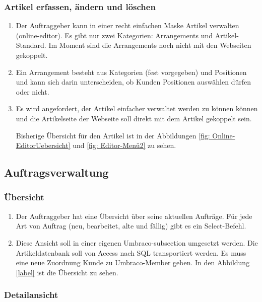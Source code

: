 \subsubsection{Artikel erfassen, ändern und löschen}

\begin{enumerate}
	\item Der Auftraggeber kann in einer recht einfachen Maske Artikel verwalten (online-editor). Es gibt nur zwei Kategorien: Arrangements und Artikel-Standard. Im Moment sind die Arrangements noch nicht mit den Webseiten gekoppelt.
	\item Ein Arrangement besteht aus Kategorien (fest vorgegeben) und Positionen und kann sich darin unterscheiden, ob Kunden Positionen auswählen dürfen oder nicht.
	\item Es wird angefordert, der Artikel einfacher verwaltet werden zu können können und die Artikelseite der Webseite soll direkt mit dem Artikel gekoppelt sein.
	
	Bisherige Übersicht für den Artikel ist in der Abbildungen \ref{fig: Online-EditorUebersicht} und \ref{fig: Editor-Menü2} zu sehen.
	
\end{enumerate} 


\subsection{Auftragsverwaltung}

\subsubsection{Übersicht}

\begin{enumerate}
	\item Der Auftraggeber hat eine Übersicht über seine aktuellen Aufträge. Für jede Art von Auftrag (neu, bearbeitet, alte und fällig) gibt es ein Select-Befehl.
	\item Diese Ansicht soll in einer eigenen Umbraco-subsection umgesetzt werden. Die Artikeldatenbank soll von Access nach SQL transportiert werden. Es muss eine neue Zuordnung Kunde zu Umbraco-Member geben.
	In den Abbildung \ref{label} ist die Übersicht zu sehen.
\end{enumerate} 



\subsubsection{Detailansicht}

